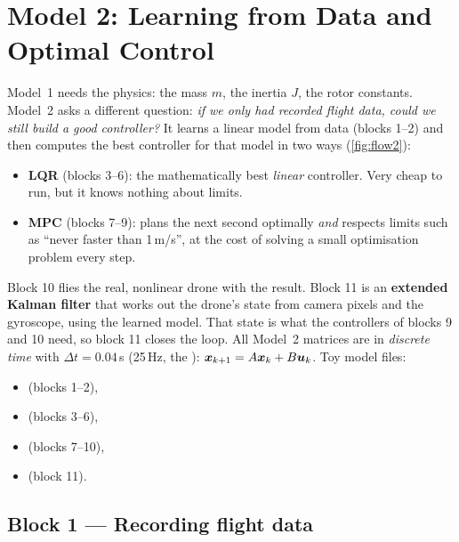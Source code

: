 \section{Model 2: Learning from Data and Optimal Control}
\label{sec:model2}

Model~1 needs the physics: the mass $m$, the inertia $J$, the rotor constants. Model~2 asks a different question:
\emph{if we only had recorded flight data, could we still build a good controller?} It learns a linear model from data
(blocks 1--2) and then computes the best controller for that model in two ways (\cref{fig:flow2}):
\begin{itemize}
  \item \textbf{LQR} (blocks 3--6): the mathematically best \emph{linear} controller. Very cheap to run, but it knows
        nothing about limits.
  \item \textbf{MPC} (blocks 7--9): plans the next second optimally \emph{and} respects limits such as
        ``never faster than 1\,m/s'', at the cost of solving a small optimisation problem every step.
\end{itemize}
Block 10 flies the real, nonlinear drone with the result. Block 11 is an \textbf{extended Kalman filter} that works
out the drone's state from camera pixels and the gyroscope, using the learned model. That state is what the
controllers of blocks 9 and 10 need, so block 11 closes the loop. All Model~2 matrices are in \emph{discrete time} with
$\Delta t=0.04$\,s (25\,Hz, the ): $\bm{x}_{k+1}=A\bm{x}_k+B\bm{u}_k$.
Toy model files:
\begin{itemize}
  \item {} (blocks 1--2),
  \item {} (blocks 3--6),
  \item {} (blocks 7--10),
  \item {} (block 11).
\end{itemize}

\subsection{Block 1 --- Recording flight data}
\label{sec:m2b1}

